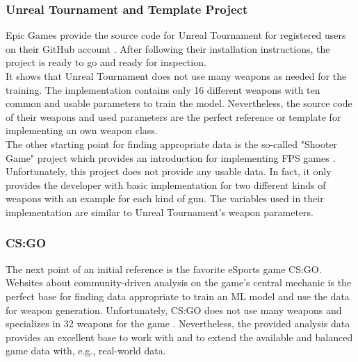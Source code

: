 \documentclass[MGS,Master,english]{twbook}%
\begin{document}
\subsubsection{Unreal Tournament and Template Project}
Epic Games provide the source code for Unreal Tournament for registered users on their GitHub account \cite{epicGames::unrealTournamentSourceCode}. After following their installation instructions, the project is ready to go and ready for inspection.\\
It shows that Unreal Tournament does not use many weapons as needed for the training. The implementation contains only 16 different weapons with ten common and usable parameters to train the model. Nevertheless, the source code of their weapons and used parameters are the perfect reference or template for implementing an own weapon class.\\
The other starting point for finding appropriate data is the so-called "Shooter Game" project which provides an introduction for implementing FPS games \cite{epicGames::shooterGame}. Unfortunately, this project does not provide any usable data. In fact, it only provides the developer with basic implementation for two different kinds of weapons with an example for each kind of gun. The variables used in their implementation are similar to Unreal Tournament’s weapon parameters.

\subsubsection{\acl{CS:GO}}
The next point of an initial reference is the favorite eSports game \ac{CS:GO}. Websites about community-driven analysis on the game's central mechanic is the perfect base for finding data appropriate to train an ML model and use the data for weapon generation. Unfortunately, CS:GO does not use many weapons and specializes in 32 weapons for the game \cite{counterstrike::wikiWeapons}. Nevertheless, the provided analysis data provides an excellent base to work with and to extend the available and balanced game data with, e.g., real-world data.
\end{document}
